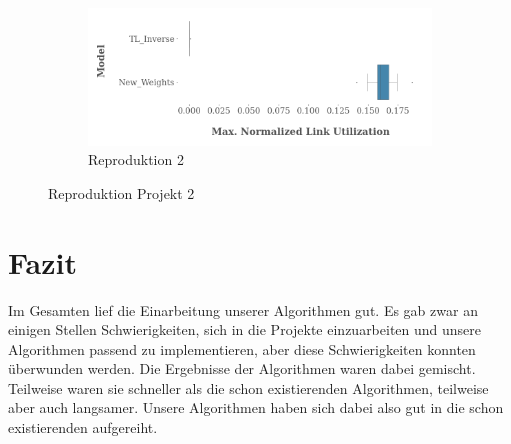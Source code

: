 \begin{figure}
\begin{subfigure}{0.45\textwidth}
                \label{fig:reproduktion_project_2_reproduktion_1}
            \end{subfigure}
            \begin{subfigure}{0.45\textwidth}
                \centering
                \includegraphics[width=1\linewidth]{Report/bilder/reproduktion/projekt2/reproduktion2.png}
                \caption{Reproduktion 2}
                \label{fig:reproduktion_project_2_reproduktion_2}
            \end{subfigure}
            
            \caption{Reproduktion Projekt 2}
            \label{fig:reproduktion_project_2}
        \end{figure}


\section{Fazit}
    Im Gesamten lief die Einarbeitung unserer Algorithmen gut. Es gab zwar an einigen Stellen Schwierigkeiten, sich in die Projekte einzuarbeiten und unsere Algorithmen passend zu implementieren, aber diese Schwierigkeiten konnten überwunden werden. Die Ergebnisse der Algorithmen waren dabei gemischt. Teilweise waren sie schneller als die schon existierenden Algorithmen, teilweise aber auch langsamer. Unsere Algorithmen haben sich dabei also gut in die schon existierenden aufgereiht. \\
    